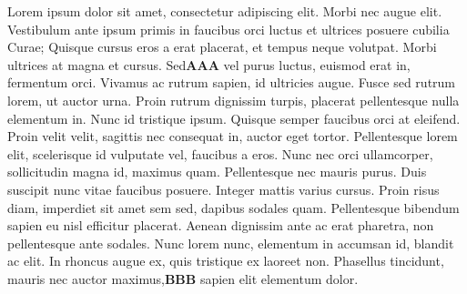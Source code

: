 \documentclass[twoside]{article}
\newcommand{\numpar}[1]{\doinsidelinehook{\markboth{#1}{#1}}\textbf{#1}}
\begin{document}
\beginnumbering
\autopar

Lorem ipsum dolor sit amet, consectetur adipiscing elit. Morbi nec augue elit. Vestibulum ante ipsum primis in faucibus orci luctus et ultrices posuere cubilia Curae; Quisque cursus eros a erat placerat, et tempus neque volutpat. Morbi ultrices at magna et cursus. Sed\numpar{AAA} vel purus luctus, euismod erat in, fermentum orci. Vivamus ac rutrum sapien, id ultricies augue. Fusce sed rutrum lorem, ut auctor urna. Proin rutrum dignissim turpis, placerat pellentesque nulla elementum in. Nunc id tristique ipsum. Quisque semper faucibus orci at eleifend. Proin velit velit, sagittis nec consequat in, auctor eget tortor. Pellentesque lorem elit, scelerisque id vulputate vel, faucibus a eros. Nunc nec orci ullamcorper, sollicitudin magna id, maximus quam. Pellentesque nec mauris purus. Duis suscipit nunc vitae faucibus posuere. Integer mattis varius cursus. Proin risus diam, imperdiet sit amet sem sed, dapibus sodales quam. Pellentesque bibendum sapien eu nisl efficitur placerat. Aenean dignissim ante ac erat pharetra, non pellentesque ante sodales. Nunc lorem nunc, elementum in accumsan id, blandit ac elit. In rhoncus augue ex, quis tristique ex laoreet non. Phasellus tincidunt, mauris nec auctor maximus,\numpar{BBB} sapien elit elementum dolor.
\end{document}
